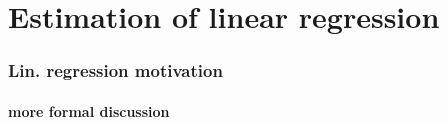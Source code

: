

\part*{Estimation of linear regression}%

\section{Lin. regression motivation}
\subsection{more formal discussion}

